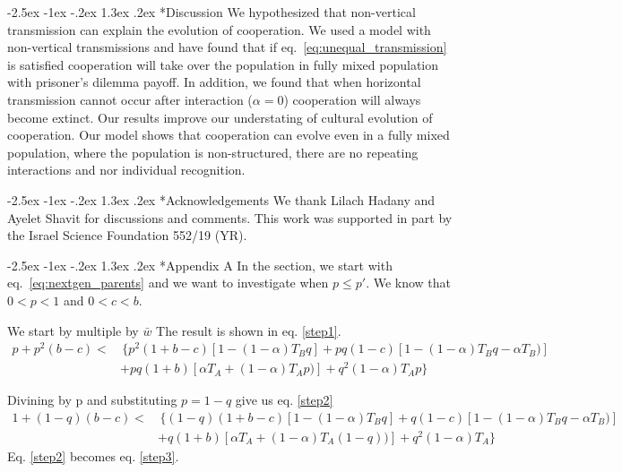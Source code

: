 \documentclass[12pt]{extarticle}
\makeatletter
\renewcommand\section{\@startsection {section}{1}{\z@}%
     {-2.5ex \@plus -1ex \@minus -.2ex}%
     {1.3ex \@plus.2ex}%
    {\Large\bfseries}}
\makeatother
\begin{document}
\section*{Discussion}
We hypothesized that non-vertical transmission can explain the evolution of cooperation. We used a model with non-vertical transmissions and have found that if eq.~\ref{eq:unequal_transmission} is satisfied cooperation will take over the population in fully mixed population with prisoner's dilemma payoff. In addition, we found that when horizontal transmission cannot occur after interaction ($\alpha = 0$) cooperation will always become extinct. 
Our results improve our understating of cultural evolution of cooperation. Our model shows that cooperation can evolve even in a fully mixed population, where the population is non-structured, there are no repeating interactions and nor individual recognition.

{\small
\section*{Acknowledgements}
We thank Lilach Hadany and Ayelet Shavit for discussions and comments.
This work was supported in part by
the Israel Science Foundation 552/19 (YR).
}




\newpage
\section*{Appendix A} %
In the section, we start with eq.~\ref{eq:nextgen_parents} and we want to investigate when $p\leq p'$. We know that $0<p<1$ and $0<c<b$.

We start by multiple by $\bar{w}$ The result is shown in eq. \eqref{step1}.
\begin{equation} 
\begin{split} \label{step1}
p + p^2(b-c) < & \, \{ p^2(1+b-c)[1-(1-\alpha)T_Bq] + pq(1-c)[1-(1-\alpha)T_Bq-\alpha T_B)]\\
&+ pq(1+b)[\alpha T_A+(1-\alpha)T_Ap)] + q^2(1-\alpha)T_Ap\}
\end{split}
\end{equation}

Divining by p and substituting $p=1-q$ give us eq. \eqref{step2}
\begin{equation} 
\begin{split} \label{step2}
1 + (1-q)(b-c) < & \, \{ (1-q)(1+b-c)[1-(1-\alpha)T_Bq] + q(1-c)[1-(1-\alpha)T_Bq-\alpha T_B)]\\
&+ q(1+b)[\alpha T_A+(1-\alpha)T_A(1-q))] + q^2(1-\alpha)T_A\}
\end{split}
\end{equation}
Eq. \eqref{step2} becomes eq. \eqref{step3}.
\end{document}
